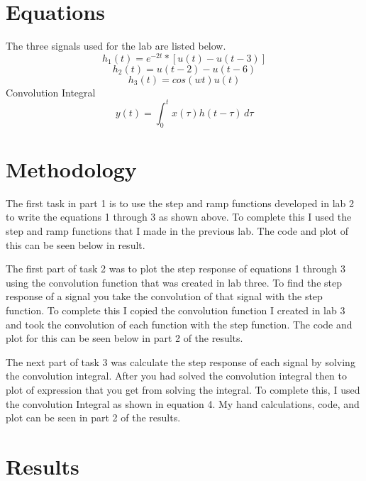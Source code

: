 \documentclass[11pt,a4]{report}
\begin{document}
\section{Equations}
The three signals used for the lab are listed below.
\begin{equation}
    h_1(t) = e^{-2t}*[u(t)-u(t-3)]
\end{equation}
\begin{equation}
    h_2(t) = u(t-2) - u(t-6)
\end{equation}
\begin{equation}
    h_3(t) = cos(wt)u(t)
\end{equation}
Convolution Integral
\begin{equation}
    y(t) =  \int_{0}^{t} x(\tau)h(t-\tau) \,d\tau 
\end{equation}
\section{Methodology}
The first task in part 1 is to use the step and ramp functions developed in lab 2 to write the equations 1 through 3 as shown above. To complete this I used the step and ramp functions that I made in the previous lab. The code and plot of this can be seen below in result. 

The first part of task 2 was to plot the step response of equations 1 through 3 using the convolution function that was created in lab three. To find the step response of a signal you take the convolution of that signal with the step function. To complete this I copied the convolution function I created in lab 3 and took the convolution of each function with the step function. The code and plot for this can be seen below in part 2 of the results. 

The next part of task 3 was calculate the step response of each signal by solving the convolution integral. After you had solved the convolution integral then to plot of expression that you get from solving the integral. To complete this, I used the convolution Integral as shown in equation 4. My hand calculations, code, and plot can be seen in part 2 of the results. 


\section{Results}
\end{document}
